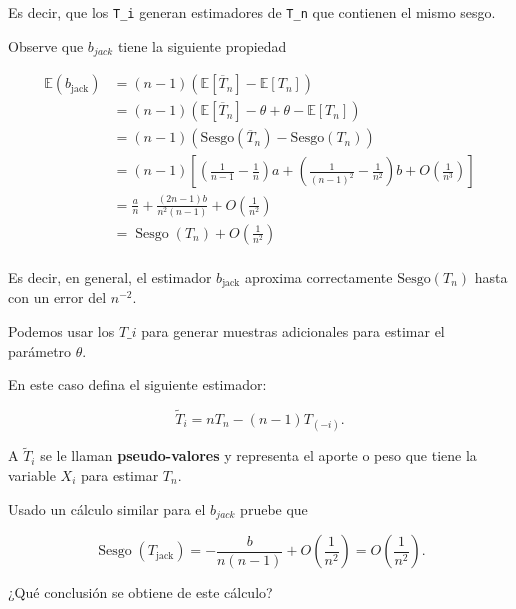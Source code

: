 \documentclass[
  12pt,
]{book}
\theoremstyle{definition}
\theoremstyle{definition}
\theoremstyle{definition}
\theoremstyle{remark}
\let\BeginKnitrBlock\begin \let\EndKnitrBlock\end
\begin{document}
Es decir, que los \texttt{T\_i} generan estimadores de \texttt{T\_n}
que contienen el mismo sesgo.

Observe que \(b_{jack}\) tiene la siguiente propiedad

\begin{align*}
\mathbb{E}\left(b_{\text {jack}}\right)
&= (n-1)\left(\mathbb{E}\left[\overline{T}_{n}\right] -
\mathbb{E}\left[T_{n}\right]\right) \\
&= (n-1)\left(\mathbb{E}\left[\overline{T}_{n}\right] - \theta +
\theta - \mathbb{E}\left[T_{n}\right]\right) \\
& =(n-1)\left(\mathrm{Sesgo} \left(\overline{T}_{n}\right)
-\mathrm{Sesgo}\left(T_{n}\right)\right) \\
& =(n-1)\left[\left(\frac{1}{n-1}
-\frac{1}{n}\right)
a+\left(\frac{1}{(n-1)^{2}}
-\frac{1}{n^{2}}\right) b+O\left(\frac{1}{n^{3}}\right)\right] \\
& =\frac{a}{n}
+\frac{(2 n-1) b}{n^{2}(n-1)}
+O\left(\frac{1}{n^{2}}\right) \\
& =\operatorname{Sesgo}\left(T_{n}\right)
+O\left(\frac{1}{n^{2}}\right)\\
\end{align*}

\BeginKnitrBlock{remark}
{}Es decir, en general, el estimador \(b_{\text{jack}}\) aproxima
correctamente \(\mathrm{Sesgo}\left( T_{n} \right)\) hasta con un
error del \(n^{-2}\).
\EndKnitrBlock{remark}

Podemos usar los \(T\_i\) para generar muestras adicionales para
estimar el parámetro \(\theta\).

En este caso defina el siguiente estimador:

\[
\widetilde{T}_{i}=n T_{n}-(n-1) T_{(-i)}.
\]

\BeginKnitrBlock{remark}
{}A \(\widetilde{T}_{i}\) se le llaman \textbf{pseudo-valores} y
representa el aporte o peso que tiene la variable \(X_{i}\) para
estimar \(T_{n}\).
\EndKnitrBlock{remark}

\BeginKnitrBlock{exercise}
\protect\hypertarget{exr:unnamed-chunk-75}{}{\label{exr:unnamed-chunk-75} }Usado un cálculo similar para el \(b_{jack}\) pruebe que

\[
\operatorname{Sesgo}\left(T_{\text {jack}
}\right)=-\frac{b}{n(n-1)}+O\left(\frac{1}{n^{2}}\right)=O\left(\frac{1}{n^{2}}\right).
\]

¿Qué conclusión se obtiene de este cálculo?
\EndKnitrBlock{exercise}
\end{document}
